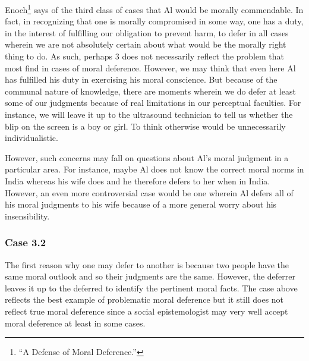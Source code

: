 \documentclass[
  12pt,
]{book}
\theoremstyle{definition}
\theoremstyle{definition}
\theoremstyle{definition}
\theoremstyle{definition}
\theoremstyle{remark}
\begin{document}
Enoch\footnote{{``A {Defense} of {Moral Deference}.''}} says of the third class of cases that Al would be morally commendable. In fact, in recognizing that one is morally compromised in some way, one has a duty, in the interest of fulfilling our obligation to prevent harm, to defer in all cases wherein we are not absolutely certain about what would be the morally right thing to do. As such, perhaps 3 does not necessarily reflect the problem that most find in cases of moral deference. However, we may think that even here Al has fulfilled his duty in exercising his moral conscience. But because of the communal nature of knowledge, there are moments wherein we do defer at least some of our judgments because of real limitations in our perceptual faculties. For instance, we will leave it up to the ultrasound technician to tell us whether the blip on the screen is a boy or girl. To think otherwise would be unnecessarily individualistic.

However, such concerns may fall on questions about Al's moral judgment in a particular area. For instance, maybe Al does not know the correct moral norms in India whereas his wife does and he therefore defers to her when in India. However, an even more controversial case would be one wherein Al defers all of his moral judgments to his wife because of a more general worry about his insensibility.

\subsubsection*{Case 3.2}\label{case-3.2}

The first reason why one may defer to another is because two people have the same moral outlook and so their judgments are the same. However, the deferrer leaves it up to the deferred to identify the pertinent moral facts. The case above reflects the best example of problematic moral deference but it still does not reflect true moral deference since a social epistemologist may very well accept moral deference at least in some cases.
\end{document}
